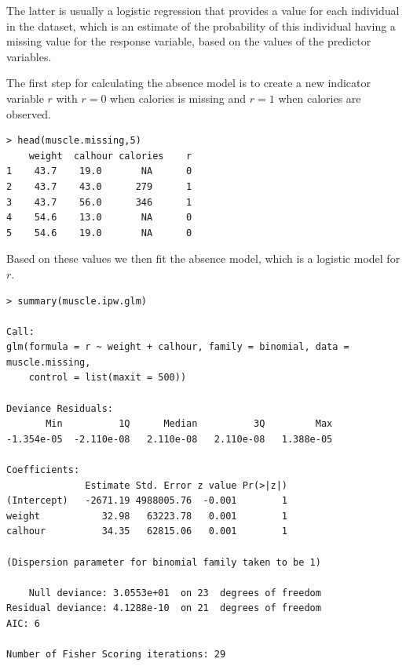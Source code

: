 \documentclass[11pt, a4paper]{article}
\begin{document}
The latter is usually a logistic regression that provides a value for
each individual in the dataset, which is an estimate of the
probability of this individual having a missing value for the response
variable, based on the values of the predictor variables.

The first step for calculating the absence model is to create a new
indicator variable $r$ with $r=0$ when calories is missing and $r=1$
when calories are observed.
\begin{verbatim}
> head(muscle.missing,5)
    weight  calhour calories    r
1    43.7    19.0       NA      0
2    43.7    43.0      279      1
3    43.7    56.0      346      1
4    54.6    13.0       NA      0
5    54.6    19.0       NA      0
\end{verbatim}

Based on these values we then fit the absence model, which is a
logistic model for $r$.
\begin{verbatim}
> summary(muscle.ipw.glm)

Call:
glm(formula = r ~ weight + calhour, family = binomial, data = muscle.missing, 
    control = list(maxit = 500))

Deviance Residuals: 
       Min          1Q      Median          3Q         Max  
-1.354e-05  -2.110e-08   2.110e-08   2.110e-08   1.388e-05  

Coefficients:
              Estimate Std. Error z value Pr(>|z|)
(Intercept)   -2671.19 4988005.76  -0.001        1
weight           32.98   63223.78   0.001        1
calhour          34.35   62815.06   0.001        1

(Dispersion parameter for binomial family taken to be 1)

    Null deviance: 3.0553e+01  on 23  degrees of freedom
Residual deviance: 4.1288e-10  on 21  degrees of freedom
AIC: 6

Number of Fisher Scoring iterations: 29
\end{verbatim}
\end{document}

